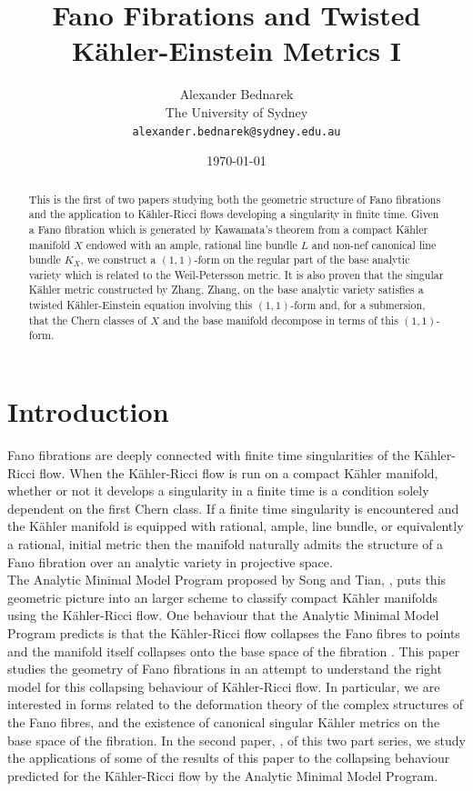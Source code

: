 \documentclass[12pt]{article}
\title{Fano Fibrations and Twisted K\"ahler-Einstein Metrics I}
\author{Alexander Bednarek\\The University of Sydney\\\texttt{alexander.bednarek@sydney.edu.au}}
\date{\today}
\numberwithin{equation}{section}
\begin{document}
\maketitle

\begin{abstract}
\noindent This is the first of two papers studying both the geometric structure of Fano fibrations and the application to K\"ahler-Ricci flows developing a singularity in finite time. Given a Fano fibration which is generated by Kawamata's theorem from a compact K\"ahler manifold $X$ endowed with an ample, rational line bundle $L$ and non-nef canonical line bundle $K_X$, we construct a $(1,1)$-form on the regular part of the base analytic variety which is related to the Weil-Petersson metric. It is also proven that the singular K\"ahler metric constructed by Zhang, Zhang, on the base analytic variety satisfies a twisted K\"ahler-Einstein equation involving this $(1,1)$-form and, for a submersion, that the Chern classes of $X$ and the base manifold decompose in terms of this $(1,1)$-form.
\end{abstract}

\section{Introduction}

\noindent Fano fibrations are deeply connected with finite time singularities of the K\"ahler-Ricci flow. When the K\"ahler-Ricci flow is run on a compact K\"ahler manifold, whether or not it develops a singularity in a finite time is a condition solely dependent on the first Chern class. If a finite time singularity is encountered and the K\"ahler manifold is equipped with rational, ample, line bundle, or equivalently a rational, initial metric then the manifold naturally admits the structure of a Fano fibration over an analytic variety in projective space.\\
The Analytic Minimal Model Program proposed by Song and Tian, \cite{BEG13,JST23,ST07,ST12}, puts this geometric picture into an larger scheme to classify compact K\"ahler manifolds using the K\"ahler-Ricci flow. One behaviour that the Analytic Minimal Model Program predicts is that the K\"ahler-Ricci flow collapses the Fano fibres to points and the manifold itself collapses onto the base space of the fibration \cite{JST23}. This paper studies the geometry of Fano fibrations in an attempt to understand the right model for this collapsing behaviour of K\"ahler-Ricci flow. In particular, we are interested in forms related to the deformation theory of the complex structures of the Fano fibres, and the existence of canonical singular K\"ahler metrics on the base space of the fibration. In the second paper, \cite{B25}, of this two part series, we study the applications of some of the results of this paper to the collapsing behaviour predicted for the K\"ahler-Ricci flow by the Analytic Minimal Model Program.\\
\end{document}
